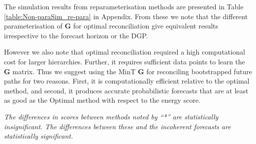 \documentclass[12pt]{article}
\theoremstyle{definition}
\begin{document}
The simulation results from reparameterisation methods are presented in Table \ref{table:Non-paraSim_re-para} in Appendix. From these we note that the different parameterisation of $\bm{G}$ for optimal reconciliation give equivalent results irrespective to the forecast horizon or the DGP.

However we also note that optimal reconciliation required a high computational cost for larger hierarchies. Further, it requires sufficient data points to learn the $\bm{G}$ matrix. Thus we suggest using the MinT $\bm{G}$ for reconciling bootstrapped future paths for two reasons. First, it is computationally efficient relative to the optimal method, and second, it produces accurate probabilistic forecasts that are at least as good as the Optimal method with respect to the energy score.

\begin{table}
	\caption{Energy scores (ES) and variogram scores (VS) for probabilistic forecasts from different reconciliation methods are presented. Bottom row represent the scores for base forecasts which are not coherent. The smaller the scores, the better the forecasts are.} \label{table:Non-paraSimulation}
	\begin{center}
		\tabcolsep=0.08cm\small
	\end{center}
	\textit{The differences in scores between methods noted by ``*'' are statistically insignificant. The differences between these and the incoherent forecasts are statistically significant.}
\end{table}
\end{document}
